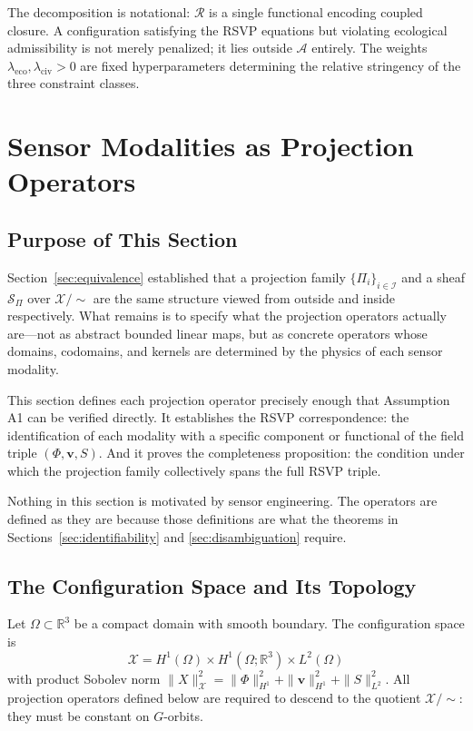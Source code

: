 \documentclass[11pt, oneside]{article}
\newcommand{\Xmod}{\mathcal{X}/{\sim}}
\begin{document}
The decomposition is notational: $\mathcal{R}$ is a single functional encoding coupled
closure. A configuration satisfying the RSVP equations but violating ecological
admissibility is not merely penalized; it lies outside $\mathcal{A}$ entirely. The
weights $\lambda_{\mathrm{eco}}, \lambda_{\mathrm{civ}} > 0$ are fixed hyperparameters
determining the relative stringency of the three constraint classes.

\section{Sensor Modalities as Projection Operators}
\label{sec:projections}

\subsection{Purpose of This Section}

Section~\ref{sec:equivalence} established that a projection family $\{\Pi_i\}_{i \in \mathcal{I}}$
and a sheaf $\mathcal{S}_\Pi$ over $\Xmod$ are the same structure viewed from outside and
inside respectively. What remains is to specify what the projection operators actually
are---not as abstract bounded linear maps, but as concrete operators whose domains,
codomains, and kernels are determined by the physics of each sensor modality.

This section defines each projection operator precisely enough that Assumption A1 can be
verified directly. It establishes the RSVP correspondence: the identification of each
modality with a specific component or functional of the field triple $(\Phi, \mathbf{v}, S)$.
And it proves the completeness proposition: the condition under which the projection family
collectively spans the full RSVP triple.

Nothing in this section is motivated by sensor engineering. The operators are defined as
they are because those definitions are what the theorems in Sections~\ref{sec:identifiability}
and \ref{sec:disambiguation} require.

\subsection{The Configuration Space and Its Topology}

Let $\Omega \subset \mathbb{R}^3$ be a compact domain with smooth boundary. The
configuration space is
\[
\mathcal{X} = H^1(\Omega) \times H^1(\Omega; \mathbb{R}^3) \times L^2(\Omega)
\]
with product Sobolev norm $\|X\|_{\mathcal{X}}^2 = \|\Phi\|_{H^1}^2 + \|\mathbf{v}\|_{H^1}^2 + \|S\|_{L^2}^2$.
All projection operators defined below are required to descend to the quotient $\Xmod$:
they must be constant on $G$-orbits.
\end{document}
